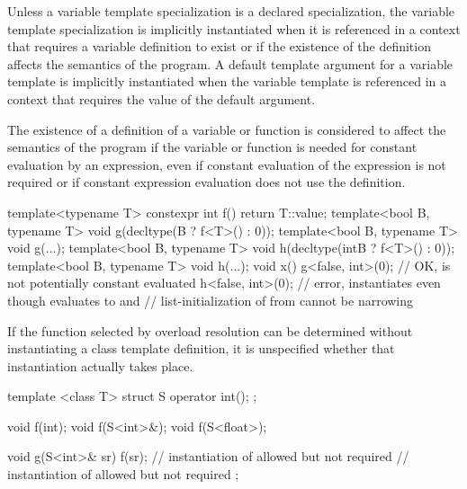 \pnum
Unless a variable template specialization is a declared specialization,
the variable template specialization is implicitly instantiated
when it is referenced in a context
that requires a variable definition to exist or
if the existence of the definition affects the semantics of the program.
A default template argument for a variable template is implicitly instantiated
when the variable template is referenced in a context
that requires the value of the default argument.

\pnum
{}%
%
%
%
The existence of a definition of a variable or function
is considered to affect the semantics of the program
if the variable or function
is needed for constant evaluation by an expression,
even if constant evaluation of the expression is not required or
if constant expression evaluation does not use the definition.

\begin{example}
\begin{codeblock}
template<typename T> constexpr int f() { return T::value; }
template<bool B, typename T> void g(decltype(B ? f<T>() : 0));
template<bool B, typename T> void g(...);
template<bool B, typename T> void h(decltype(int{B ? f<T>() : 0}));
template<bool B, typename T> void h(...);
void x() {
  g<false, int>(0); // OK,  is not potentially constant evaluated
  h<false, int>(0); // error, instantiates  even though  evaluates to  and
                    // list-initialization of  from  cannot be narrowing
}
\end{codeblock}
\end{example}

\pnum
If the function selected by overload resolution
can be determined without instantiating a class template definition,
it is unspecified whether that instantiation actually takes place.
\begin{example}
\begin{codeblock}
template <class T> struct S {
  operator int();
};

void f(int);
void f(S<int>&);
void f(S<float>);

void g(S<int>& sr) {
  f(sr);            // instantiation of  allowed but not required
                    // instantiation of  allowed but not required
};
\end{codeblock}
\end{example}

